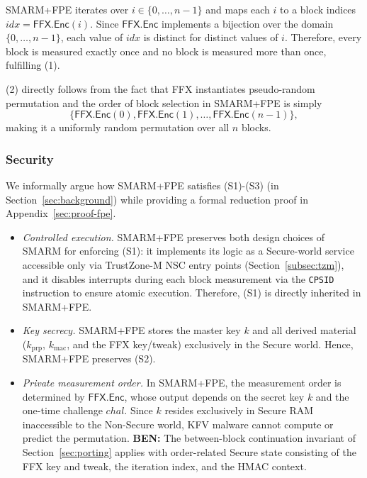 \documentclass{ieeeaccess}
\DeclareRobustCommand{\ben}[1]{{\color{BENcolor}\textbf{BEN:} #1}}
\newcommand{\rtsmarmtwo}{SMARM+FPE\xspace}
\begin{document}
\rtsmarmtwo iterates over $i \in \{0, \ldots, n-1\}$ 
and maps each $i$ to a block indices 
$idx = \mathsf{FFX.Enc}(i)$.
Since $\mathsf{FFX.Enc}$ implements a bijection over the domain 
$\{0, \ldots, n-1\}$, each value of $idx$ is distinct for 
distinct values of $i$.
Therefore, every block is measured exactly once and no block 
is measured more than once, fulfilling (1).

(2) directly follows from the fact that FFX instantiates pseudo-random permutation and the order of block selection in \rtsmarmtwo is simply\[
  \{\mathsf{FFX.Enc}(0), \mathsf{FFX.Enc}(1), \ldots,
    \mathsf{FFX.Enc}(n-1)\},
\] making it a uniformly random permutation over all $n$ blocks.



\subsubsection{Security}
We informally argue how \rtsmarmtwo satisfies (S1)-(S3) (in Section~\ref{sec:background}) while providing a formal reduction proof in Appendix~\ref{sec:proof-fpe}.

\begin{itemize}
  \item[(S1)] \emph{Controlled execution.}
  \rtsmarmtwo preserves both design choices of SMARM for 
  enforcing (S1): it implements its logic as a Secure-world 
  service accessible only via TrustZone-M NSC entry points 
  (Section~\ref{subsec:tzm}), and it disables interrupts 
  during each block measurement via the \texttt{CPSID} 
  instruction to ensure atomic execution.
  Therefore, (S1) is directly inherited in \rtsmarmtwo.

  \item[(S2)] \emph{Key secrecy.}
  \rtsmarmtwo stores the master key $k$ and all derived material ($k_{\mathrm{prp}}$, $k_{\mathrm{mac}}$, and the FFX key/tweak) exclusively in the Secure world.
  Hence, \rtsmarmtwo preserves (S2).

  \item[(S3)] \emph{Private measurement order.}
  In \rtsmarmtwo, the measurement order is determined by 
  $\mathsf{FFX.Enc}$, whose output depends on the 
  secret key $k$ and the one-time challenge $chal$.
  Since $k$ resides exclusively in Secure RAM inaccessible to the Non-Secure world, KFV malware cannot compute or predict the permutation.
  \ben{The between-block continuation invariant of Section~\ref{sec:porting} applies with order-related Secure state consisting of the FFX key and tweak, the iteration index, and the HMAC context.}

\end{itemize}
\end{document}
